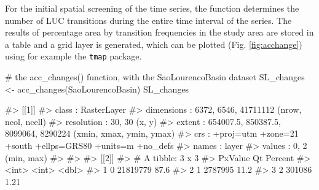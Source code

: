 For the initial spatial screening of the time series, the 
function determines the number of LUC transitions during the entire time
interval of the series. The results of percentage area by transition
frequencies in the study area are stored in a table and a grid layer is
generated, which can be plotted (Fig. \ref{fig:acchange}) using for
example the \texttt{tmap} package.

\begin{Schunk}
\begin{Sinput}
# the acc_changes() function, with the SaoLourencoBasin dataset
SL_changes <- acc_changes(SaoLourencoBasin)
SL_changes
\end{Sinput}
\begin{Soutput}
#> [[1]]
#> class      : RasterLayer 
#> dimensions : 6372, 6546, 41711112  (nrow, ncol, ncell)
#> resolution : 30, 30  (x, y)
#> extent     : 654007.5, 850387.5, 8099064, 8290224  (xmin, xmax, ymin, ymax)
#> crs        : +proj=utm +zone=21 +south +ellps=GRS80 +units=m +no_defs 
#> names      : layer 
#> values     : 0, 2  (min, max)
#> 
#> 
#> [[2]]
#> # A tibble: 3 x 3
#>   PxValue       Qt Percent
#>     <int>    <int>   <dbl>
#> 1       0 21819779   87.6 
#> 2       1  2787995   11.2 
#> 3       2   301086    1.21
\end{Soutput}
\end{Schunk}

